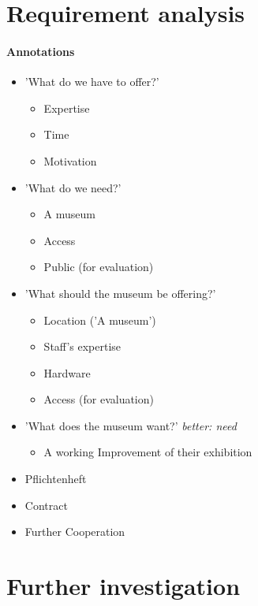 
\section{Requirement analysis}
\label{museums_requirement}

\paragraph{Annotations}

\begin{itemize}
	\item 'What do we have to offer?'
	\begin{itemize}
		\item Expertise
		\item Time
		\item Motivation
	\end{itemize}
	\item 'What do we need?'
	\begin{itemize}
		\item A museum
		\item Access
		\item Public (for evaluation)
	\end{itemize}
	\item 'What should the museum be offering?'
	\begin{itemize}
		\item Location ('A museum')
		\item Staff's expertise
		\item Hardware
		\item Access (for evaluation)
	\end{itemize}
	\item 'What does the museum want?' \textit{better: need}
	\begin{itemize}
		\item A working Improvement of their exhibition
	\end{itemize}
	\item Pflichtenheft
	\item Contract
	\item Further Cooperation
\end{itemize}


\section{Further investigation}
\label{museums_investigation}


